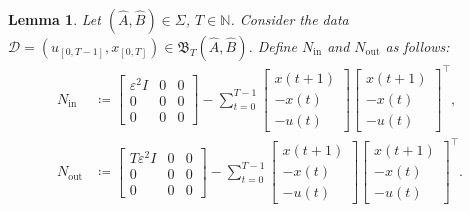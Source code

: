\documentclass[journal,twoside,web]{ieeecolor}
\newtheorem{lemma}[theorem]{Lemma}
\begin{document}

\begin{lemma}
\label{lem:exp_qmi}
Let $(\hat{A},\hat{B})\in\Sigma$, $T\in\mathbb{N}$. Consider the data \mbox{$\mathcal{D}=(u_{[0,T-1]},x_{[0,T]})\in\mathfrak{B}_T(\hat{A},\hat{B})$}. Define $N_\text{in}$ and $N_\text{out}$ as follows:
\begin{subequations}
\begin{align}
\label{eq:N_in}
N_\text{in}&\coloneqq\begin{bmatrix}
\varepsilon^2 I & 0 & 0 \\
0 & 0 & 0 \\
0 & 0 & 0
\end{bmatrix}\!-\! \sum_{t=0}^{T-1}\begin{bmatrix}
x(t+1) \\
-x(t) \\
-u(t)
\end{bmatrix}\!\!\!\begin{bmatrix}
x(t+1) \\
-x(t) \\
-u(t)
\end{bmatrix}^\top\!\!, \\
\label{eq:N_out}
N_\text{out}&\coloneqq\begin{bmatrix}
T \varepsilon^2 I & 0 & 0 \\
0 & 0 & 0 \\
0 & 0 & 0
\end{bmatrix}-\sum_{t=0}^{T-1}\begin{bmatrix}
x(t+1) \\
-x(t) \\
-u(t)
\end{bmatrix}\begin{bmatrix}
x(t+1) \\
-x(t) \\
-u(t)
\end{bmatrix}^\top\!\!.

\end{align}
\end{subequations}
\end{lemma}
\end{document}

